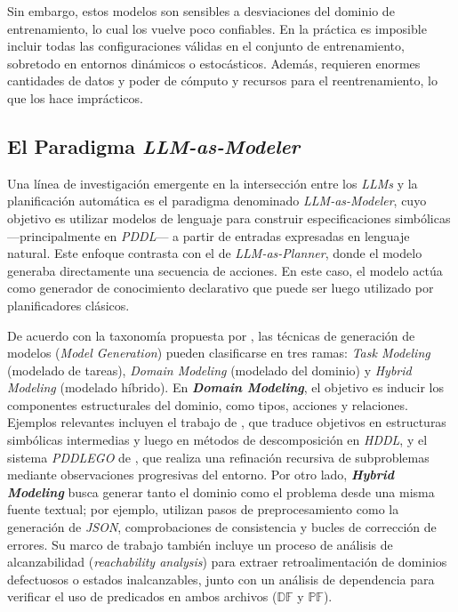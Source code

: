 Sin embargo, estos modelos son sensibles a desviaciones del dominio de entrenamiento, lo cual los vuelve poco confiables. En la práctica es imposible incluir todas las configuraciones válidas en el conjunto de entrenamiento, sobretodo en entornos dinámicos o estocásticos. Además, requieren enormes cantidades de datos y poder de cómputo y recursos para el reentrenamiento, lo que los hace imprácticos.

\subsection{El Paradigma \textit{LLM-as-Modeler}}

Una línea de investigación emergente en la intersección entre los \textit{LLMs} y la planificación automática es el paradigma denominado \textit{LLM-as-Modeler}, cuyo objetivo es utilizar modelos de lenguaje para construir especificaciones simbólicas —principalmente en \textit{PDDL}— a partir de entradas expresadas en lenguaje natural. Este enfoque contrasta con el de \textit{LLM-as-Planner}, donde el modelo generaba directamente una secuencia de acciones. En este caso, el modelo actúa como generador de conocimiento declarativo que puede ser luego utilizado por planificadores clásicos.

De acuerdo con la taxonomía propuesta por \textcite{tantakoun2025llms}, las técnicas de generación de modelos (\textit{Model Generation}) pueden clasificarse en tres ramas: \textit{Task Modeling} (modelado de tareas), \textit{Domain Modeling} (modelado del dominio) y \textit{Hybrid Modeling} (modelado híbrido). En \textbf{\textit{Domain Modeling}}, el objetivo es inducir los componentes estructurales del dominio, como tipos, acciones y relaciones. Ejemplos relevantes incluyen el trabajo de \textcite{fine2024leveraging}, que traduce objetivos en estructuras simbólicas intermedias y luego en métodos de descomposición en \textit{HDDL}, y el sistema \textit{PDDLEGO} de \textcite{zhang2024pddlego}, que realiza una refinación recursiva de subproblemas mediante observaciones progresivas del entorno. Por otro lado, \textbf{\textit{Hybrid Modeling}} busca generar tanto el dominio como el problema desde una misma fuente textual; por ejemplo, \textcite{smirnov2024generating} utilizan pasos de preprocesamiento como la generación de \textit{JSON}, comprobaciones de consistencia y bucles de corrección de errores. Su marco de trabajo también incluye un proceso de análisis de alcanzabilidad (\textit{reachability analysis}) para extraer retroalimentación de dominios defectuosos o estados inalcanzables, junto con un análisis de dependencia para verificar el uso de predicados en ambos archivos ($\mathbb{DF}$ y $\mathbb{PF}$).


